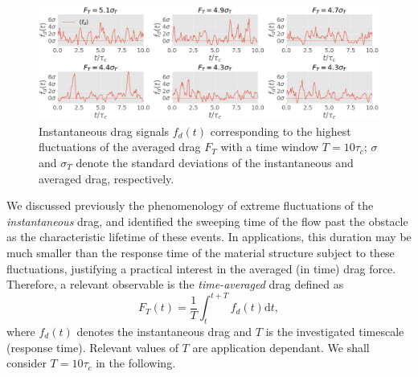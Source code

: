 \documentclass{jfm}
\begin{document}
\begin{figure}
	\centering
	\includegraphics[width=\linewidth]{timeseries_extrms_AVG/timeseries_extrms_AVG}
	\caption{Instantaneous drag signals $f_d(t)$ corresponding to the highest fluctuations of the averaged  drag $F_T$ with a time window $T = 10 \tau_c$;  $\sigma$ and $\sigma_T$ denote the standard deviations of the instantaneous and averaged drag, respectively.}
	\label{fig:extreme_avg}
\end{figure}


%

We discussed previously the phenomenology of extreme fluctuations of the \emph{instantaneous} drag, and identified the sweeping time of the flow past the obstacle as the characteristic lifetime of these events. 
%
In applications, this duration may be much smaller than the response time of the material structure subject to these fluctuations, justifying a practical interest in the averaged (in time) drag force. 
%
%
Therefore, a relevant observable is the \textit{time-averaged} drag defined as
\begin{equation}
  \label{eq:def_time_averaged_drag}
  F_T(t) = \frac{1}{T}\int_t^{t+T} f_d(t) \mathrm{d}t,
\end{equation}
where $f_d(t)$ denotes the instantaneous drag and $T$ is the investigated timescale (response time).
Relevant values of $T$ are application dependant.
We shall consider $T=10\tau_c$ in the following.
\end{document}

